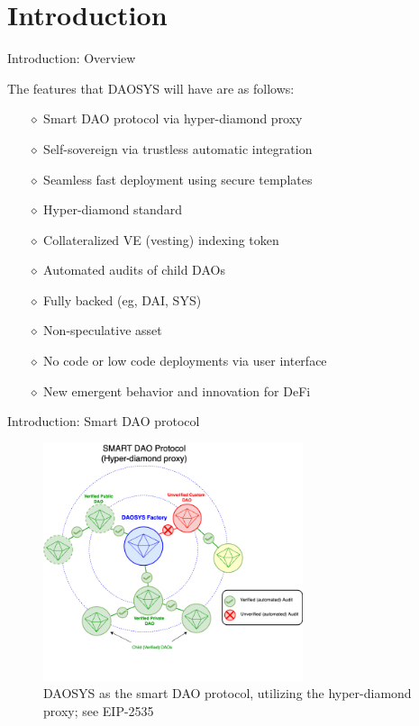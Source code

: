 \documentclass[10pt,xcolor=svgnames]{beamer} %
\begin{document}
\section{Introduction}

\begin{frame}{Introduction: Overview} %


The features that DAOSYS will have are as follows:

\begin{itemize}
  \item[$\diamond$] Smart DAO protocol via hyper-diamond proxy
  \item[$\diamond$] Self-sovereign via trustless automatic integration
  \item[$\diamond$] Seamless fast deployment using secure templates
  \item[$\diamond$] Hyper-diamond standard
  \item[$\diamond$] Collateralized VE (vesting) indexing token
  \item[$\diamond$] Automated audits of child DAOs
  \item[$\diamond$] Fully backed (eg, DAI, SYS)
  \item[$\diamond$] Non-speculative asset
  \item[$\diamond$] No code or low code deployments via user interface
  \item[$\diamond$] New emergent behavior and innovation for DeFi
\end{itemize}  

\end{frame}


\begin{frame}{Introduction: Smart DAO protocol} %

\begin{figure}[h!]
\includegraphics[width=3in]{img/smart_dao.png}
\caption{DAOSYS as the smart DAO protocol, utilizing the hyper-diamond proxy; see EIP-2535} 
\label{fig:daosys_protocol}
\end{figure}

\end{frame}
\end{document}
